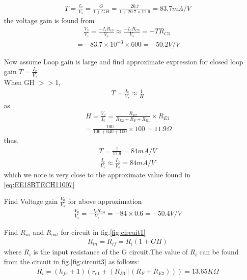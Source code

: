 \begin{enumerate}[label=\thesubsection.\arabic*.,ref=\thesubsection.\theenumi]
{ \begin{align}
 \label{eq:EE18BTECH11007}
    T=\frac{I_0}{V_s}=\frac{G}{1+GH}=\frac{20.7}{1+20.7\times11.9}=83.7mA/V
\end{align}
 the voltage gain is found from 
\begin{align}
    \frac{V_0}{V_s}=\frac{-I_cR_{c3}}{V_s}\approx\frac{-I_0R_{C3}}{V_s}=-TR_{C3}
    \
\end{align}
\begin{align}
    =-83.7\times10^{-3}\times600=-50.2V/V
\end{align}
\item Now assume Loop gain is large and find approximate expression for closed loop gain $T=\frac{I_o}{V_s}$
\\
\solution When GH $>>$1,
\begin{align}
    T =\frac{I_0}{V_s}\approx \frac{1}{H}
\end{align}
as
\begin{align}
    H=\frac{V_f}{I_0}=\frac{R_{E2}}{R_{E2}+R_F+R_{E1}} \times R_{E1}
\end{align}
\begin{align}
    =\frac{100}{100+640+100}\times 100=11.9\Omega
\end{align}
thus,
\begin{align}
   T =\frac{1}{11.9}=84mA/V
\end{align}
\begin{align}
 \frac{I_c}{V_s}\approx\frac{I_0}{V_s}=84 mA/V
 \end{align}
 which  we note is very close to the approximate value found in \eqref{eq:EE18BTECH11007} 
\item Find Voltage gain $\frac{V_0}{V_s}$ for above approximation
\\
\solution 
\begin{align}
\frac{V_0}{V_s}=\frac{-I_c R_{C3}}{V_s}=-84\times0.6=-50.4V/V
\end{align}
\item Find $R_{in}$ and $R_{out}$ for circuit in  fig.\ref{fig:circuit1}
\\
\solution
\begin{align}
    R_{in} =R_{if}=R_i(1+GH)
\end{align}
where $R_i$ is the input resistance of the G circuit.The value of $R_i$ can be found from the circuit in fig.\ref{fig:circuit3} as follows:
\begin{align}
    R_i=(h_{fe}+1)(r_{e1}+(R_{E1}||(R_F+R_{E2})))=13.65K\Omega
\end{align} 
}
\end{enumerate}
